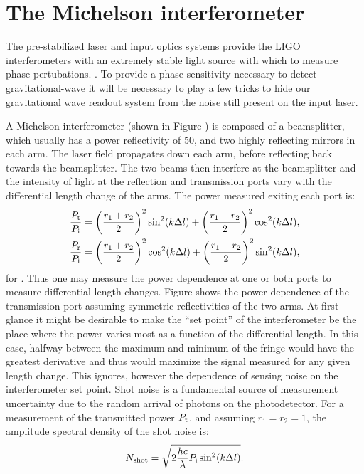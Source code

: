 \section{The Michelson interferometer}
The pre-stabilized laser and input optics systems provide the LIGO interferometers with an extremely stable light source with which to measure phase pertubations. %
. %
To provide a phase sensitivity necessary to detect gravitational-wave it will be necessary to play a few tricks to hide our gravitational wave readout system from the noise still present on the input laser.

A Michelson interferometer (shown in Figure ) is composed of a beamsplitter, which usually has a power reflectivity of 50\perc{}, and two highly reflecting mirrors in each arm. %
The laser field propagates down each arm, before reflecting back towards the beamsplitter. %
The two beams then interfere at the beamsplitter and the intensity of light at the reflection and transmission ports vary with the differential length change of the arms. %
The power measured exiting each port is:
\begin{align}
\frac{P_{\rm{t}}}{P_{\rm{i}}} &= \left(\frac{r_1+r_2}{2}\right)^2\sin^2(k\Delta l)+\left(\frac{r_1-r_2}{2}\right)^2\cos^2(k\Delta l),\\
\frac{P_{\rm{r}}}{P_{\rm{i}}} &= \left(\frac{r_1+r_2}{2}\right)^2\cos^2(k\Delta l)+\left(\frac{r_1-r_2}{2}\right)^2\sin^2(k\Delta l),
\end{align}
for . %
Thus one may measure the power dependence at one or both ports to measure differential length changes. %
Figure  shows the power dependence of the transmission port assuming symmetric reflectivities of the two arms. %
At first glance it might be desirable to make the ``set point'' %
of the interferometer be the place where the power varies most as a function of the differential length. %
In this case, halfway between the maximum and minimum of the fringe would have the greatest derivative and thus would maximize the signal measured for any given length change. %
This ignores, however the dependence of sensing noise on the interferometer set point. %
Shot noise is a fundamental source of measurement uncertainty due to the random arrival of photons on the photodetector. %
For a measurement of the transmitted power $P_{\rm t}$, and assuming $r_1=r_2=1$, the amplitude spectral density of the shot noise is:
\begin{equation}
N_{\rm{shot}}=\sqrt{2\frac{hc}{\lambda}P_{\rm i}\sin^2(k\Delta l)}.
\end{equation}
